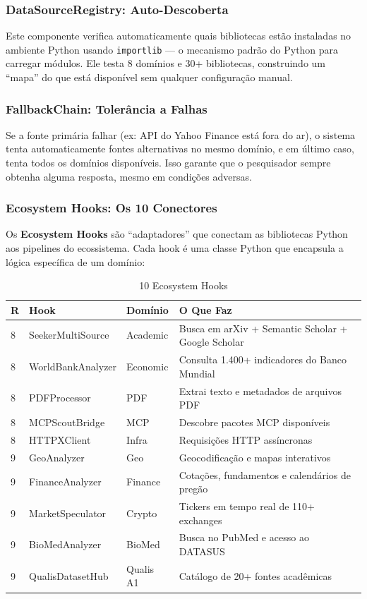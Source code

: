 \documentclass[12pt,a4paper]{article}
\begin{document}
\subsubsection{DataSourceRegistry: Auto-Descoberta}

Este componente verifica automaticamente quais bibliotecas estão instaladas no ambiente Python usando \texttt{importlib} --- o mecanismo padrão do Python para carregar módulos. Ele testa 8 domínios e 30+ bibliotecas, construindo um ``mapa'' do que está disponível sem qualquer configuração manual.

\subsubsection{FallbackChain: Tolerância a Falhas}

Se a fonte primária falhar (ex: API do Yahoo Finance está fora do ar), o sistema tenta automaticamente fontes alternativas no mesmo domínio, e em último caso, tenta todos os domínios disponíveis. Isso garante que o pesquisador sempre obtenha alguma resposta, mesmo em condições adversas.

\subsubsection{Ecosystem Hooks: Os 10 Conectores}

Os \textbf{Ecosystem Hooks} são ``adaptadores'' que conectam as bibliotecas Python aos pipelines do ecossistema. Cada hook é uma classe Python que encapsula a lógica específica de um domínio:

\begin{table}[H]
  \centering
  \caption{10 Ecosystem Hooks}
  \begin{tabular}{l l l l}
    \toprule
    \textbf{R} & \textbf{Hook} & \textbf{Domínio} & \textbf{O Que Faz} \\
    \midrule
    8 & SeekerMultiSource   & Academic  & Busca em arXiv + Semantic Scholar + Google Scholar \\
    8 & WorldBankAnalyzer   & Economic  & Consulta 1.400+ indicadores do Banco Mundial \\
    8 & PDFProcessor        & PDF       & Extrai texto e metadados de arquivos PDF \\
    8 & MCPScoutBridge      & MCP       & Descobre pacotes MCP disponíveis \\
    8 & HTTPXClient         & Infra     & Requisições HTTP assíncronas \\
    9 & GeoAnalyzer         & Geo       & Geocodificação e mapas interativos \\
    9 & FinanceAnalyzer     & Finance   & Cotações, fundamentos e calendários de pregão \\
    9 & MarketSpeculator    & Crypto    & Tickers em tempo real de 110+ exchanges \\
    9 & BioMedAnalyzer      & BioMed    & Busca no PubMed e acesso ao DATASUS \\
    9 & QualisDatasetHub    & Qualis A1 & Catálogo de 20+ fontes acadêmicas \\
    \bottomrule
  \end{tabular}
\end{table}
\end{document}
